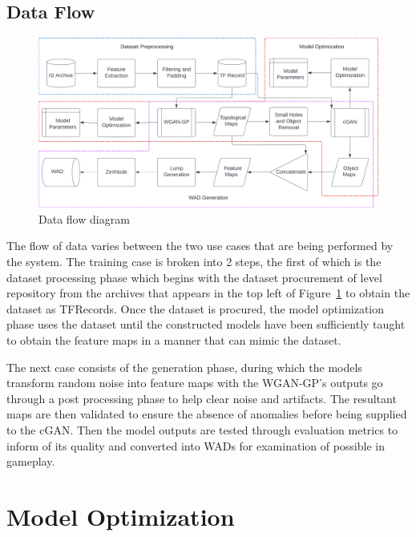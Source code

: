 \documentclass{Configuration_Files/PoliMi3i_thesis}
\begin{document}
\subsection{Data Flow}
\begin{figure}[H]
    \centering
    \includegraphics[width=1\textwidth]{data_flow.jpeg}
    \caption{Data flow diagram}
    \label{fig:dataflow}
\end{figure}
The flow of data varies between the two use cases that are being performed by the system. The training case is 
broken into 2 steps, the first of which is the dataset processing phase which begins with the dataset procurement 
of level repository from the archives that appears in the top left of Figure~\ref{fig:dataflow} to obtain the dataset 
as TFRecords. Once the dataset is procured, the model optimization phase uses the dataset until the constructed 
models have been sufficiently taught to obtain the feature maps in a manner that can mimic the dataset.

The next case consists of the generation phase, during which the models transform random 
noise into feature maps with the WGAN-GP’s outputs go through a post processing 
phase to help clear noise and artifacts. The resultant maps are then validated to 
ensure the absence of anomalies before being supplied to the cGAN. Then the model 
outputs are tested through evaluation metrics to inform of its quality and converted 
into WADs for examination of possible in gameplay.
\newpage

\section{Model Optimization}
\end{document}
